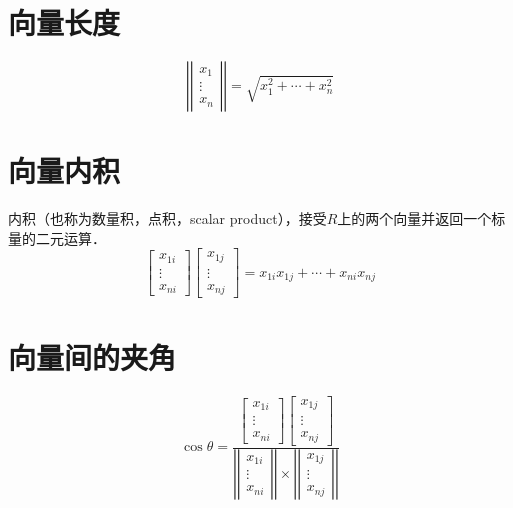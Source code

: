 \documentclass[12pt]{article}
\begin{document}
\begin{CJK}{UTF8}{gbsn}
\section{向量长度}
\begin{equation}
\left|\left|
\begin{array}{c}
x_1\\\vdots\\x_n
\end{array}
\right|\right|=
\sqrt{x_1^2+\cdots+x_n^2}
\end{equation}
\section{向量内积}
内积（也称为数量积，点积，scalar product），接受$R$上的两个向量并返回一个标量的二元运算．
\begin{equation}
\left[
\begin{array}{c}
x_{1i}\\\vdots\\x_{ni}
\end{array}
\right]
\left[
\begin{array}{c}
x_{1j}\\\vdots\\x_{nj}
\end{array}
\right]=x_{1i}x_{1j}+\cdots+x_{ni}x_{nj}
\end{equation}
\section{向量间的夹角}
\begin{equation}
\cos\theta = \dfrac{\left[
\begin{array}{c}
x_{1i}\\\vdots\\x_{ni}
\end{array}
\right]\left[
\begin{array}{c}
x_{1j}\\\vdots\\x_{nj}
\end{array}
\right]}{\left|\left|
\begin{array}{c}
x_{1i}\\\vdots\\x_{ni}
\end{array}
\right|\right|\times\left|\left|
\begin{array}{c}
x_{1j}\\\vdots\\x_{nj}
\end{array}
\right|\right|}
\end{equation}


\end{CJK}
\end{document}
